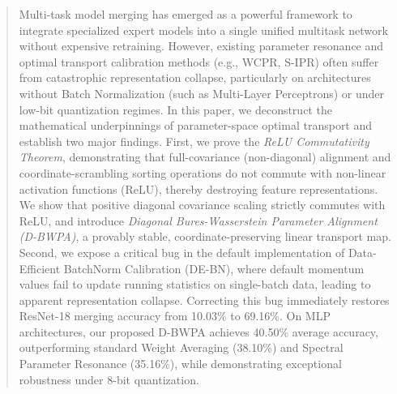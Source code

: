 \documentclass{article}
\theoremstyle{plain}
\theoremstyle{definition}
\theoremstyle{remark}
\begin{document}

\printAffiliationsAndNotice{}

\begin{abstract}
  Multi-task model merging has emerged as a powerful framework to integrate specialized expert models into a single unified multitask network without expensive retraining. However, existing parameter resonance and optimal transport calibration methods (e.g., WCPR, S-IPR) often suffer from catastrophic representation collapse, particularly on architectures without Batch Normalization (such as Multi-Layer Perceptrons) or under low-bit quantization regimes. In this paper, we deconstruct the mathematical underpinnings of parameter-space optimal transport and establish two major findings. First, we prove the \emph{ReLU Commutativity Theorem}, demonstrating that full-covariance (non-diagonal) alignment and coordinate-scrambling sorting operations do not commute with non-linear activation functions (ReLU), thereby destroying feature representations. We show that positive diagonal covariance scaling strictly commutes with ReLU, and introduce \emph{Diagonal Bures-Wasserstein Parameter Alignment (D-BWPA)}, a provably stable, coordinate-preserving linear transport map. Second, we expose a critical bug in the default implementation of Data-Efficient BatchNorm Calibration (DE-BN), where default momentum values fail to update running statistics on single-batch data, leading to apparent representation collapse. Correcting this bug immediately restores ResNet-18 merging accuracy from 10.03\% to 69.16\%. On MLP architectures, our proposed D-BWPA achieves 40.50\% average accuracy, outperforming standard Weight Averaging (38.10\%) and Spectral Parameter Resonance (35.16\%), while demonstrating exceptional robustness under 8-bit quantization.
\end{abstract}
\end{document}
